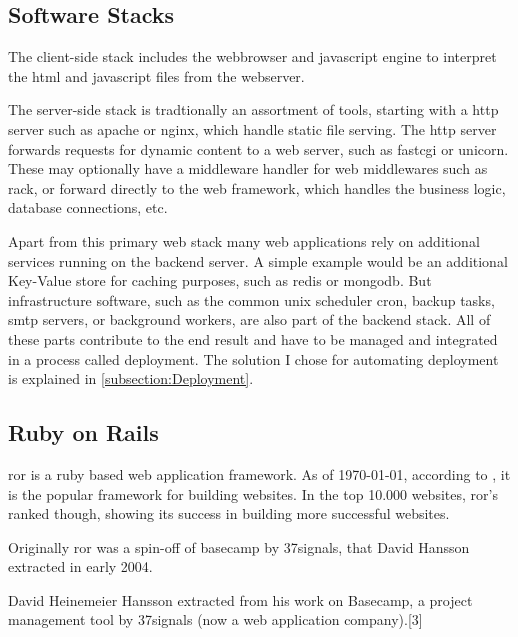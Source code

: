 \subsection{Software Stacks}

The client-side stack includes the webbrowser and \gls{javascript} engine to interpret the \gls{html} and \gls{javascript} files from the webserver.

The server-side stack is tradtionally an assortment of tools, starting with a \gls{http} server such as \gls{apache} or \gls{nginx}, which handle static file serving. The \gls{http} server forwards requests for dynamic content to a web server, such as \gls{fastcgi} or \gls{unicorn}. These may optionally have a middleware handler for web middlewares such as \gls{rack}, or forward directly to the web framework, which handles the business logic, database connections, etc.

Apart from this primary web stack many web applications rely on additional services running on the backend server. A simple example would be an additional Key-Value store for caching purposes, such as \gls{redis} or \gls{mongodb}. But infrastructure software, such as the common unix scheduler \gls{cron}, backup tasks, \gls{smtp} servers, or background workers, are also part of the backend stack. All of these parts contribute to the end result and have to be managed and integrated in a process called deployment. The solution I chose for automating deployment is explained in \autoref{subsection:Deployment}.

\subsection{Ruby on Rails}

\acrfull{ror} is a \gls{ruby} based web application framework. As of \today, according to \citet{builtwith}, it is the  popular framework for building websites. In the top 10.000 websites, \gls{ror}'s ranked  though, showing its success in building more successful websites.

Originally \gls{ror} was a spin-off of \gls{basecamp} by 37signals, that David Hansson extracted in early 2004.\citep{railsinterview}
\citep{agilewebdev}

David Heinemeier Hansson extracted  from his work on Basecamp, a project management tool by 37signals (now a web application company).[3]



